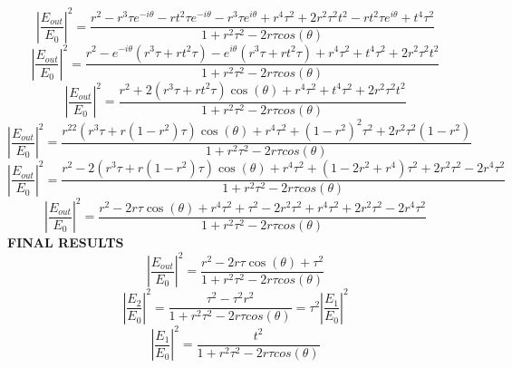 %
\begin{equation}
\left |\frac{E_{out}}{E_{0}}\right|^2=\frac{r^2-r^3\tau e^{-i\theta}-rt^2\tau e^{-i\theta}-r^3\tau e^{i\theta}+r^4\tau^2+2r^2\tau^2t^2-rt^2\tau e^{i\theta}+t^4\tau^2}{1+r^2\tau^2-2r\tau cos(\theta)}
\end{equation}
%
\begin{equation}
\left |\frac{E_{out}}{E_{0}}\right|^2=\frac{r^2-e^{-i\theta}(r^3\tau+rt^2\tau)-e^{i\theta}(r^3\tau+rt^2\tau)+r^4\tau^2+t^4\tau^2+2r^2\tau^2t^2}{1+r^2\tau^2-2r\tau cos(\theta)}
\end{equation}
%
\begin{equation}
\left |\frac{E_{out}}{E_{0}}\right|^2=\frac{r^2+2(r^3\tau+rt^2\tau)\cos(\theta)+r^4\tau^2+t^4\tau^2+2r^2\tau^2t^2}{1+r^2\tau^2-2r\tau cos(\theta)}
\end{equation}
%
\begin{equation}
\left |\frac{E_{out}}{E_{0}}\right|^2=\frac{r^22(r^3\tau+r(1-r^2)\tau)\cos(\theta)+r^4\tau^2+(1-r^2)^2\tau^2+2r^2\tau^2(1-r^2)}{1+r^2\tau^2-2r\tau cos(\theta)}
\end{equation}
%
\begin{equation}
\left |\frac{E_{out}}{E_{0}}\right|^2=\frac{r^2-2(r^3\tau+r(1-r^2)\tau)\cos(\theta)+r^4\tau^2+(1-2r^2+r^4)\tau^2+2r^2\tau^2-2r^4\tau^2}{1+r^2\tau^2-2r\tau cos(\theta)}
\end{equation}
%
\begin{equation}
\left |\frac{E_{out}}{E_{0}}\right|^2=\frac{r^2-2r\tau\cos(\theta)+r^4\tau^2+\tau^2-2r^2\tau^2+r^4\tau^2+2r^2\tau^2-2r^4\tau^2}{1+r^2\tau^2-2r\tau cos(\theta)}
\end{equation}
%
\bf{FINAL RESULTS}
\begin{equation}
\left |\frac{E_{out}}{E_{0}}\right|^2=\frac{r^2-2r\tau\cos(\theta)+\tau^2}{1+r^2\tau^2-2r\tau cos(\theta)}
\end{equation}
\begin{equation}
\left |\frac{E_{2}}{E_{0}}\right |^2=\frac{\tau^2-\tau^2r^2}{1+r^2\tau^2-2r\tau cos(\theta)}=\tau^2\left|\frac{E_{1}}{E_{0}}\right |^2
\end{equation}
\begin{equation}
\left|\frac{E_{1}}{E_{0}}\right |^2=\frac{t^2}{1+r^2\tau^2-2r\tau cos(\theta)}
\end{equation}